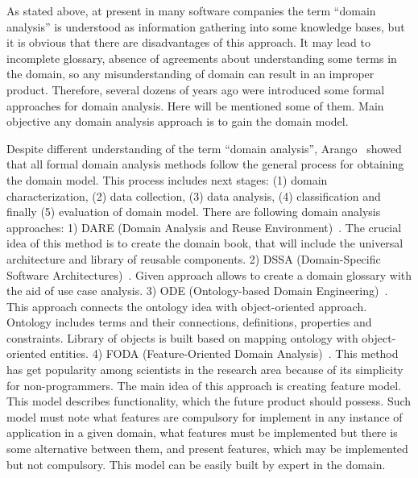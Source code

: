 \documentclass[conference]{IEEEtran}
\begin{document}
As stated above, at present in many software companies the term ``domain analysis'' is understood as information gathering into some knowledge bases, but it is obvious that there are disadvantages of this approach. It may lead to incomplete glossary, absence of agreements about understanding some terms in the domain, so any misunderstanding of domain can result in an improper product. Therefore, several dozens of years ago were introduced some formal approaches for domain analysis. Here will be mentioned some of them. Main objective any domain analysis approach is to gain the domain model.  

Despite different understanding of the term ``domain analysis'', Arango~\cite{arango1994domain} showed that all formal domain analysis methods follow the general process for obtaining the domain model. This process includes next stages: (1) domain characterization, (2) data collection, (3) data analysis, (4) classification and finally (5) evaluation of domain model. There are following domain analysis approaches: 1) DARE (Domain Analysis and Reuse Environment)~\cite{frakes1998dare}. The crucial idea of this method is to create the domain book, that will include the universal architecture and library of reusable components. 2) DSSA (Domain-Specific Software Architectures)~\cite{taylor1995software}. Given approach allows to create a domain glossary with the aid of use case analysis. 3) ODE (Ontology-based Domain Engineering)~\cite{falbo2002ontological}. This approach connects the ontology idea with object-oriented approach. Ontology includes  terms and their connections, definitions, properties and constraints. Library of objects is built based on mapping ontology with object-oriented entities. 4) FODA (Feature-Oriented Domain Analysis)~\cite{kang1990feature}. This method has get popularity among scientists in the research area because of its simplicity for non-programmers. The main idea of this approach is creating feature model. This model describes functionality, which the future product should possess. Such model must note what features are compulsory for implement in any instance of application in a given domain, what features must be implemented but there is some alternative between them, and present features, which may be implemented but not compulsory. This model can be easily built by expert in the domain. 
\end{document}
